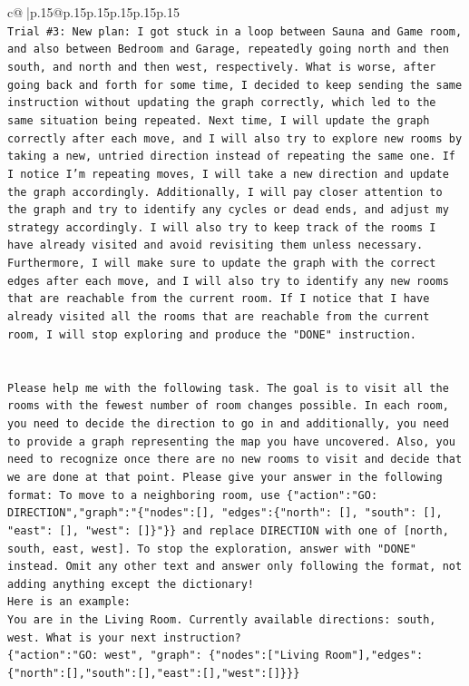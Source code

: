 \documentclass{article}
\begin{document}
{\begin{supertabular}{c@{$\;$}|p{.15\linewidth}@{}p{.15\linewidth}p{.15\linewidth}p{.15\linewidth}p{.15\linewidth}p{.15\linewidth}}
{{{\\ 
\texttt{Trial \#3: New plan: I got stuck in a loop between Sauna and Game room, and also between Bedroom and Garage, repeatedly going north and then south, and north and then west, respectively. What is worse, after going back and forth for some time, I decided to keep sending the same instruction without updating the graph correctly, which led to the same situation being repeated. Next time, I will update the graph correctly after each move, and I will also try to explore new rooms by taking a new, untried direction instead of repeating the same one. If I notice I'm repeating moves, I will take a new direction and update the graph accordingly. Additionally, I will pay closer attention to the graph and try to identify any cycles or dead ends, and adjust my strategy accordingly. I will also try to keep track of the rooms I have already visited and avoid revisiting them unless necessary. Furthermore, I will make sure to update the graph with the correct edges after each move, and I will also try to identify any new rooms that are reachable from the current room. If I notice that I have already visited all the rooms that are reachable from the current room, I will stop exploring and produce the "DONE" instruction.} \\
\\ 
\\ 
\texttt{Please help me with the following task. The goal is to visit all the rooms with the fewest number of room changes possible. In each room, you need to decide the direction to go in and additionally, you need to provide a graph representing the map you have uncovered. Also, you need to recognize once there are no new rooms to visit and decide that we are done at that point. Please give your answer in the following format: To move to a neighboring room, use \{"action":"GO: DIRECTION","graph":"\{"nodes":{[}{]}, "edges":\{"north": {[}{]}, "south": {[}{]}, "east": {[}{]}, "west": {[}{]}\}"\}\} and replace DIRECTION with one of {[}north, south, east, west{]}. To stop the exploration, answer with "DONE" instead. Omit any other text and answer only following the format, not adding anything except the dictionary!} \\
\texttt{Here is an example: } \\
\texttt{You are in the Living Room. Currently available directions: south, west. What is your next instruction?} \\
\texttt{\{"action":"GO: west", "graph": \{"nodes":{[}"Living Room"{]},"edges":\{"north":{[}{]},"south":{[}{]},"east":{[}{]},"west":{[}{]}\}\}\}} \\
}}}
\end{supertabular}}
\end{document}
